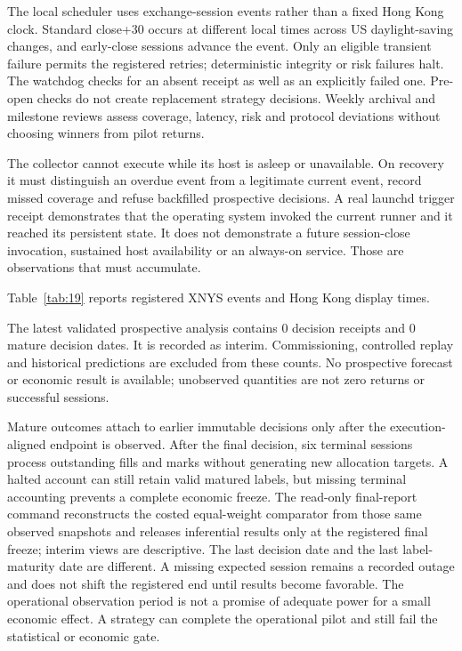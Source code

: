 The local scheduler uses exchange-session events rather than a fixed Hong Kong clock. Standard close+30 occurs at different local times across US daylight-saving changes, and early-close sessions advance the event. Only an eligible transient failure permits the registered retries; deterministic integrity or risk failures halt. The watchdog checks for an absent receipt as well as an explicitly failed one. Pre-open checks do not create replacement strategy decisions. Weekly archival and milestone reviews assess coverage, latency, risk and protocol deviations without choosing winners from pilot returns.

The collector cannot execute while its host is asleep or unavailable. On recovery it must distinguish an overdue event from a legitimate current event, record missed coverage and refuse backfilled prospective decisions. A real launchd trigger receipt demonstrates that the operating system invoked the current runner and it reached its persistent state. It does not demonstrate a future session-close invocation, sustained host availability or an always-on service. Those are observations that must accumulate.

\noindent Table~\ref{tab:19} reports registered XNYS events and Hong Kong display times.



The latest validated prospective analysis contains 0 decision receipts and 0 mature decision dates. It is recorded as interim. Commissioning, controlled replay and historical predictions are excluded from these counts. No prospective forecast or economic result is available; unobserved quantities are not zero returns or successful sessions.

Mature outcomes attach to earlier immutable decisions only after the execution-aligned endpoint is observed. After the final decision, six terminal sessions process outstanding fills and marks without generating new allocation targets. A halted account can still retain valid matured labels, but missing terminal accounting prevents a complete economic freeze. The read-only final-report command reconstructs the costed equal-weight comparator from those same observed snapshots and releases inferential results only at the registered final freeze; interim views are descriptive. The last decision date and the last label-maturity date are different. A missing expected session remains a recorded outage and does not shift the registered end until results become favorable. The operational observation period is not a promise of adequate power for a small economic effect. A strategy can complete the operational pilot and still fail the statistical or economic gate.
